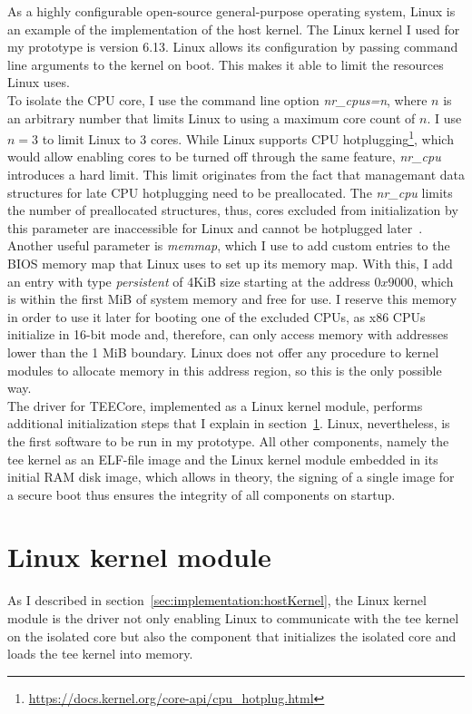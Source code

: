 As a highly configurable open-source general-purpose operating system, Linux is
an example of the implementation of the host kernel. The Linux kernel I used for
my prototype is version 6.13. Linux allows its configuration by passing command
line arguments to the kernel on boot. This makes it able to limit the resources
Linux uses. \\

To isolate the CPU core, I use the command line option \textit{nr\_cpus=n},
where $n$ is an arbitrary number that limits Linux to using a maximum core
count of $n$. I use $n=3$ to limit Linux to 3 cores. While Linux supports CPU
hotplugging\footnote{\url{https://docs.kernel.org/core-api/cpu_hotplug.html}},
which would allow enabling cores to be turned off through the same feature,
\textit{nr\_cpu} introduces a hard limit. This limit originates from the fact
that managemant data structures for late CPU hotplugging need to be
preallocated. The \textit{nr\_cpu} limits the number of preallocated structures,
thus, cores excluded from initialization by this parameter are inaccessible for
Linux and cannot be hotplugged later~\cite{kernel-parameters}. \\

Another useful parameter is \textit{memmap}, which I use to add custom entries
to the BIOS memory map that Linux uses to set up its memory map. With this, I
add an entry with type \textit{persistent} of 4KiB size starting at the address
$0x9000$, which is within the first MiB of system memory and free for use. I
reserve this memory in order to use it later for booting one of the excluded
CPUs, as x86 CPUs initialize in 16-bit mode and, therefore, can only access
memory with addresses lower than the 1 MiB boundary. Linux does not offer any
procedure to kernel modules to allocate memory in this address region, so this
is the only possible way.\\

The driver for TEECore, implemented as a Linux kernel module, performs
additional initialization steps that I explain in
section~\ref{sec:implementation:kmod}. Linux, nevertheless, is the first
software to be run in my prototype. All other components, namely the \gls{tee}
kernel as an ELF-file image and the Linux kernel module embedded in its initial
RAM disk image, which allows in theory, the signing of a single image for a
secure boot thus ensures the integrity of all components on startup.\\

\section{Linux kernel module}
\label{sec:implementation:kmod}
As I described in section~\ref{sec:implementation:hostKernel}, the Linux kernel
module is the driver not only enabling Linux to communicate with the \gls{tee}
kernel on the isolated core but also the component that initializes the isolated
core and loads the \gls{tee} kernel into memory.\\

